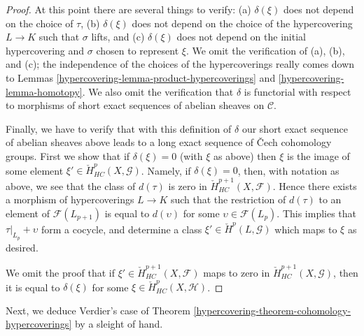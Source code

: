 \begin{proof}
\medskip\noindent
At this point there are several things to verify:
(a) $\delta(\xi)$ does not depend on the choice of $\tau$,
(b) $\delta(\xi)$ does not depend on the choice of the hypercovering
$L \to K$ such that $\sigma$ lifts, and
(c) $\delta(\xi)$ does not depend on the initial hypercovering and
$\sigma$ chosen to represent $\xi$. We omit the verification of
(a), (b), and (c); the independence of the choices of the hypercoverings
really comes down to Lemmas \ref{hypercovering-lemma-product-hypercoverings}
and \ref{hypercovering-lemma-homotopy}. We also omit the verification that
$\delta$ is functorial with respect to morphisms of short exact
sequences of abelian sheaves on $\mathcal{C}$.

\medskip\noindent
Finally, we have to verify that with this definition of $\delta$
our short exact sequence of abelian sheaves above leads to a
long exact sequence of {\v C}ech cohomology groups.
First we show that if $\delta(\xi) = 0$ (with $\xi$ as above) then
$\xi$ is the image of some element
$\xi' \in \check{H}^p_{HC}(X, \mathcal{G})$.
Namely, if $\delta(\xi) = 0$, then, with notation as above, we
see that the class of $d(\tau)$ is zero in
$\check{H}^{p + 1}_{HC}(X, \mathcal{F})$. Hence there exists
a morphism of hypercoverings $L \to K$ such that the restriction
of $d(\tau)$ to an element of $\mathcal{F}(L_{p + 1})$ is
equal to $d(\upsilon)$ for some $\upsilon \in \mathcal{F}(L_p)$.
This implies that $\tau|_{L_p} + \upsilon$ form a
cocycle, and determine a class $\xi' \in \check{H}^p(L, \mathcal{G})$
which maps to $\xi$ as desired.

\medskip\noindent
We omit the proof that if $\xi' \in \check{H}^{p + 1}_{HC}(X, \mathcal{F})$
maps to zero in $\check{H}^{p + 1}_{HC}(X, \mathcal{G})$, then it is
equal to $\delta(\xi)$ for some $\xi \in \check{H}^p_{HC}(X, \mathcal{H})$.
\end{proof}

Next, we deduce Verdier's case of
Theorem \ref{hypercovering-theorem-cohomology-hypercoverings}
by a sleight of hand.

